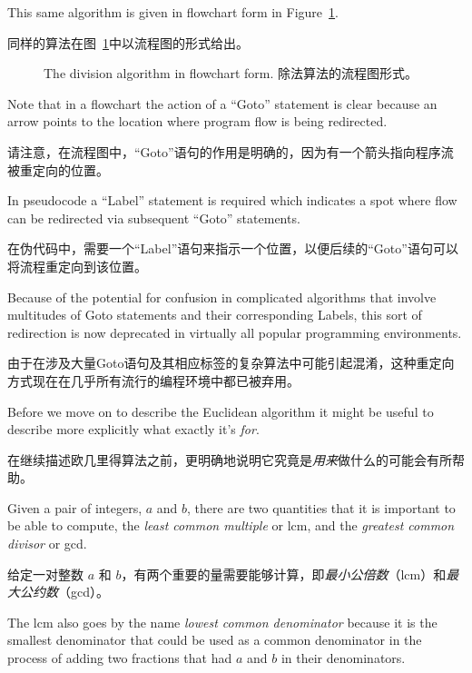 This same algorithm is given in flowchart form in
Figure~\ref{fig:div_alg}.

同样的算法在图~\ref{fig:div_alg}中以流程图的形式给出。

\begin{figure}[!hbt]
\begin{center}

\end{center}
\caption{The division algorithm in flowchart form. 除法算法的流程图形式。}
\label{fig:div_alg}
\end{figure}

Note that in a flowchart the action of a ``Goto'' statement is clear
because an arrow points to the location where program flow is being
redirected.

请注意，在流程图中，“Goto”语句的作用是明确的，因为有一个箭头指向程序流被重定向的位置。

In pseudocode a ``Label'' statement is required which
indicates a spot where flow can be redirected via subsequent ``Goto''
statements.

在伪代码中，需要一个“Label”语句来指示一个位置，以便后续的“Goto”语句可以将流程重定向到该位置。

Because of the potential for confusion in complicated
algorithms that involve multitudes of Goto statements and their
corresponding Labels, this sort of redirection is now deprecated in
virtually all popular programming environments.

由于在涉及大量Goto语句及其相应标签的复杂算法中可能引起混淆，这种重定向方式现在在几乎所有流行的编程环境中都已被弃用。

Before we move on to describe the Euclidean algorithm it might be
useful to describe more explicitly what exactly it's {\em for}.

在继续描述欧几里得算法之前，更明确地说明它究竟是{\em 用来}做什么的可能会有所帮助。

Given a pair of integers, $a$ and $b$, there are two quantities that 
it is important to be able to compute, the 
\emph{least common multiple}
or lcm, and the  
\emph{greatest common divisor} or gcd.

给定一对整数 $a$ 和 $b$，有两个重要的量需要能够计算，即\emph{最小公倍数}（lcm）和\emph{最大公约数}（gcd）。

The lcm also
goes by the name {\em lowest common denominator} because it is the
smallest denominator that could be used as a common denominator in the
process of adding two fractions that had $a$ and $b$ in their
denominators.

